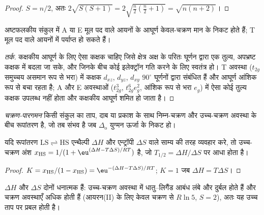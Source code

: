 \begin{proof}
$S = n/2$, अतः $2\sqrt{S(S+1)} = 2\sqrt{\frac n2(\frac n2 + 1)} = \sqrt{n(n+2)}$।
\end{proof}

\begin{proposition}[कक्षकीय योगदान]\label{prop:b3:complex-spectra-magnetism:orbital-contribution}
अष्टफलकीय संकुल में A या E मूल पद वाले आयनों के आघूर्ण
केवल-चक्रण मान के निकट होते हैं; T मूल पद वाले आयनों में पर्याप्त  हो सकते हैं।
\end{proposition}

\begin{proof}[तर्क]
कक्षकीय आघूर्ण के लिए ऐसा कक्षक चाहिए जिसे क्षेत्र अक्ष के परितः घूर्णन द्वारा
एक तुल्य, अपभ्रष्ट कक्षक में बदला जा सके, और जिनके बीच कोई इलेक्ट्रॉन
गति करने के लिए स्वतंत्र हो। T अवस्था ($t_{2g}$ समुच्चय असमान रूप से भरा) में कक्षक $d_{xz}$, $d_{yz}$, $d_{xy}$
$90^\circ$ घूर्णनों द्वारा संबंधित हैं और आघूर्ण आंशिक रूप से बचा रहता है; A और E अवस्थाओं
($t_{2g}^3$, $t_{2g}^6e_g^2$, आंशिक रूप से भरा $e_g$) में ऐसा कोई तुल्य कक्षक उपलब्ध नहीं होता और
कक्षकीय आघूर्ण शमित हो जाता है।
\end{proof}

\begin{definition}[चक्रण-पारगमन]\label{def:b3:complex-spectra-magnetism:spin-crossover}
\emph{चक्रण-पारगमन} किसी संकुल का ताप, दाब या प्रकाश के साथ
निम्न-चक्रण और उच्च-चक्रण अवस्था के बीच रूपांतरण है, जो
तब संभव है जब $\Delta_{\mathrm o}$ युग्मन ऊर्जा के निकट हो।
\end{definition}

\begin{proposition}[पारगमन ताप]\label{prop:b3:complex-spectra-magnetism:crossover}
यदि रूपांतरण $\mathrm{LS} \rightleftharpoons \mathrm{HS}$ एन्थैल्पी $\Delta H$ और एन्ट्रॉपी $\Delta S$ वाले साम्य की तरह व्यवहार करे, तो
उच्च-चक्रण अंश $x_{\mathrm{HS}} = 1/(1 + \eu^{(\Delta H - T\Delta S)/RT})$ है, जो $T_{1/2} = \Delta H/\Delta S$ पर आधा होता है।
\end{proposition}

\begin{proof}
$K = x_{\mathrm{HS}}/(1 - x_{\mathrm{HS}}) = \eu^{-(\Delta H - T\Delta S)/RT}$; $K = 1$ जब $\Delta H = T\Delta S$।
\end{proof}

$\Delta H$ और $\Delta S$ दोनों धनात्मक हैं: उच्च-चक्रण अवस्था में धातु--लिगैंड आबंध लंबे और दुर्बल
होते हैं और चक्रण अवस्थाएँ अधिक होती हैं (आयरन(II) के लिए केवल चक्रण से $R\ln5$, $S = 2$), अतः यह
उच्च ताप पर प्रबल होती है।

